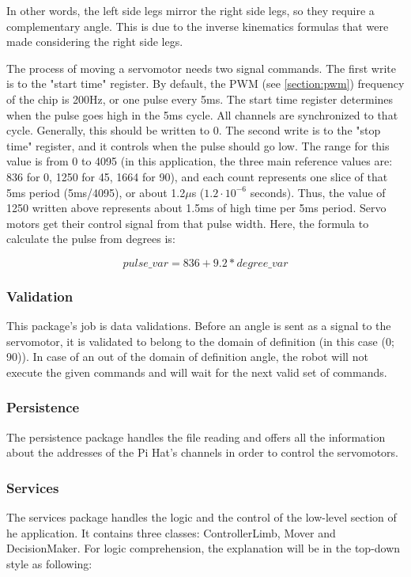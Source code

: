 \documentclass[runningheads,a4paper,12pt]{report}
\begin{document}
In other words, the left side legs mirror the right side legs, so they require a complementary angle. This is due to the inverse kinematics formulas that were made considering the right side legs. 

The process of moving a servomotor needs two signal commands. The first write is to the "start time" register. By default, the PWM (see \ref{section:pwm}) frequency of the chip is 200Hz, or one pulse every 5ms. The start time register determines when the pulse goes high in the 5ms cycle. All channels are synchronized to that cycle. Generally, this should be written to 0. The second write is to the "stop time" register, and it controls when the pulse should go low. The range for this value is from 0 to 4095 (in this application, the three main reference values are: 836 for 0\textdegree, 1250 for 45\textdegree, 1664 for 90\textdegree), and each count represents one slice of that 5ms period (5ms/4095), or about 1.2$\mu$s ($1.2 \cdot 10^{-6}$ seconds). Thus, the value of 1250 written above represents about 1.5ms of high time per 5ms period. Servo motors get their control signal from that pulse width. Here, the formula to calculate the pulse from degrees is: 

\[pulse\_var = 836 + 9.2 * degree\_var\]

\subsubsection{Validation}
This package's job is data validations. Before an angle is sent as a signal to the servomotor, it is validated to belong to the domain of definition (in this case (0\textdegree; 90\textdegree)). In case of an out of the domain of definition angle, the robot will not execute the given commands and will wait for the next valid set of commands.

\subsubsection{Persistence}
The persistence package handles the file reading and offers all the information about the addresses of the Pi Hat's channels in order to control the servomotors. 

\subsubsection{Services}
The services package handles the logic and the control of the low-level section of he application. It contains three classes: ControllerLimb, Mover and DecisionMaker. For logic comprehension, the explanation will be in the top-down style as following: 
\end{document}
